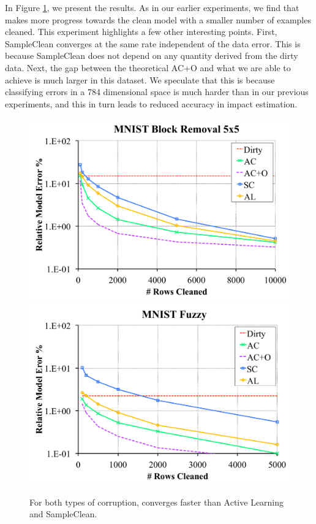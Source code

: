 In Figure \ref{mnist}, we present the results.
As in our earlier experiments, we find that \sys makes more progress towards the clean model with a smaller number of examples cleaned.
This experiment highlights a few other interesting points.
First, SampleClean converges at the same rate independent of the data error.
This is because SampleClean does not depend on any quantity derived from the dirty data.
Next, the gap between the theoretical AC+O and what we are able to achieve is much larger in this dataset.
We speculate that this is because classifying errors in a 784 dimensional space is much harder than in our previous experiments, and this in turn leads to reduced accuracy in impact estimation.


\begin{figure}[ht]
\centering
 \includegraphics[scale=0.16]{exp/exp7a.pdf}
 \includegraphics[scale=0.16]{exp/exp7b.pdf}
 \caption{For both types of corruption, \sys converges faster than Active Learning and SampleClean. \label{mnist}}
\end{figure}

